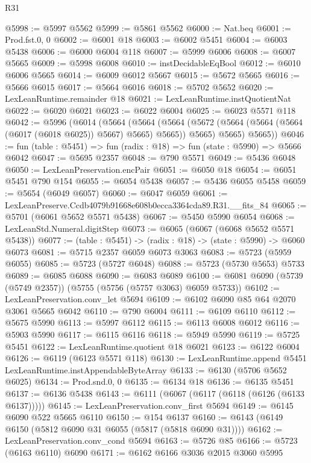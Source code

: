 \begin{lexlean}{R31}
\begin{coremodule}
@5998 := @5997 @5562
@5999 := @5861 @5562
@6000 := Nat.beq
@6001 := Prod.fst.{0, 0}
@6002 := @6001 @18
@6003 := @6002 @5451
@6004 := @6003 @5438
@6006 := @6000 @6004 @118
@6007 := @5999 @6006
@6008 := @6007 @5665
@6009 := @5998 @6008
@6010 := instDecidableEqBool
@6012 := @6010 @6006 @5665
@6014 := @6009 @6012 @5667
@6015 := @5672 @5665
@6016 := @5666 @6015
@6017 := @5664 @6016
@6018 := @5702 @5652
@6020 := LexLeanRuntime.remainder @18
@6021 := LexLeanRuntime.instQuotientNat
@6022 := @6020 @6021
@6023 := @6022 @6004
@6025 := @6023 @5571 @118
@6042 := @5996
    (@6014
      (@5664
        (@5664
          (@5664 (@5672 (@5664 (@5664 (@5664 (@6017 (@6018 @6025)) @5667) @5665) @5665)) @5665)
          @5665)
        @5665))
@6046 := fun (table : @5451) => fun (radix : @18) => fun (state : @5990) => @5666 @6042
@6047 := @5695 @2357
@6048 := @790 @5571
@6049 := @5436 @6048
@6050 := LexLeanPreservation.encPair
@6051 := @6050 @18
@6054 := @6051 @5451 @790 @154
@6055 := @6054 @5438
@6057 := @5436 @6055 @5458
@6059 := @5654 (@6049 @6057)
@6060 := @6047 @6059
@6061 := LexLeanPreserve.Ccdb4079b91668e608b0ecca3364cda89.R31.__fits_84
@6065 := @5701 (@6061 @5652 @5571 @5438)
@6067 := @5450 @5990 @6054
@6068 := LexLeanStd.Numeral.digitStep
@6073 := @6065 (@6067 (@6068 @5652 @5571 @5438))
@6077 := (table : @5451) -> (radix : @18) -> (state : @5990) -> @6060 @6073
@6081 := @5715 @2357 @6059 @6073 @3063
@6083 := @5723 (@5959 @6055)
@6085 := @5723 (@5727 @6048)
@6088 := @5723 (@5730 @5653) @5733
@6089 := @6085 @6088
@6090 := @6083 @6089
@6100 := @6081 @6090 (@5739 (@5749 @2357)) (@5755 (@5756 (@5757 @3063) @6059 @5733))
@6102 := LexLeanPreservation.conv_let @5694
@6109 := @6102 @6090 @85 @64 @2070 @3061 @5665 @6042
@6110 := @790 @6004
@6111 := @6109 @6110
@6112 := @5675 @5990
@6113 := @5997 @6112
@6115 := @6113 @6008 @6012
@6116 := @5903 @5990
@6117 := @6115 @6116
@6118 := @5949 @5990
@6119 := @5725 @5451
@6122 := LexLeanRuntime.quotient @18 @6021
@6123 := @6122 @6004
@6126 := @6119 (@6123 @5571 @118)
@6130 := LexLeanRuntime.append @5451 LexLeanRuntime.instAppendableByteArray
@6133 := @6130 (@5706 @5652 @6025)
@6134 := Prod.snd.{0, 0}
@6135 := @6134 @18
@6136 := @6135 @5451
@6137 := @6136 @5438
@6143 := @6111 (@6067 (@6117 (@6118 (@6126 (@6133 @6137)))))
@6145 := LexLeanPreservation.conv_first @5694
@6149 := @6145 @6090 @522 @5665 @6110
@6150 := @154 @6137
@6160 := @6143 (@6149 @6150 (@5812 @6090 @31 @6055 (@5817 (@5818 @6090 @31))))
@6162 := LexLeanPreservation.conv_cond @5694
@6163 := @5726 @85
@6166 := @5723 (@6163 @6110) @6090
@6171 := @6162 @6166 @3036 @2015 @3060 @5995

\end{coremodule}
\end{lexlean}
